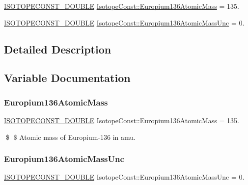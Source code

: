 \begin{DoxyCompactItemize}
\item 
\mbox{\hyperlink{group___isotope_const-_macros_ga8f45a7272ce02c0b4c65c44636ed719a}{I\+S\+O\+T\+O\+P\+E\+C\+O\+N\+S\+T\+\_\+\+D\+O\+U\+B\+LE}} \mbox{\hyperlink{group___isotope_const-_europium-_eu136_ga1d40b2c8821fce6782147cfffcae695d}{Isotope\+Const\+::\+Europium136\+Atomic\+Mass}} = 135.
\item 
\mbox{\hyperlink{group___isotope_const-_macros_ga8f45a7272ce02c0b4c65c44636ed719a}{I\+S\+O\+T\+O\+P\+E\+C\+O\+N\+S\+T\+\_\+\+D\+O\+U\+B\+LE}} \mbox{\hyperlink{group___isotope_const-_europium-_eu136_ga01836f0c534108e09c55f8033e7f0e2b}{Isotope\+Const\+::\+Europium136\+Atomic\+Mass\+Unc}} = 0.
\end{DoxyCompactItemize}


\subsection{Detailed Description}


\subsection{Variable Documentation}
\mbox{\label{group___isotope_const-_europium-_eu136_ga1d40b2c8821fce6782147cfffcae695d}} 
\subsubsection{\texorpdfstring{Europium136\+Atomic\+Mass}{Europium136AtomicMass}}
{\footnotesize\ttfamily \mbox{\hyperlink{group___isotope_const-_macros_ga8f45a7272ce02c0b4c65c44636ed719a}{I\+S\+O\+T\+O\+P\+E\+C\+O\+N\+S\+T\+\_\+\+D\+O\+U\+B\+LE}} Isotope\+Const\+::\+Europium136\+Atomic\+Mass = 135.}

\$ \$ Atomic mass of Europium-\/136 in amu. \mbox{\label{group___isotope_const-_europium-_eu136_ga01836f0c534108e09c55f8033e7f0e2b}} 
\subsubsection{\texorpdfstring{Europium136\+Atomic\+Mass\+Unc}{Europium136AtomicMassUnc}}
{\footnotesize\ttfamily \mbox{\hyperlink{group___isotope_const-_macros_ga8f45a7272ce02c0b4c65c44636ed719a}{I\+S\+O\+T\+O\+P\+E\+C\+O\+N\+S\+T\+\_\+\+D\+O\+U\+B\+LE}} Isotope\+Const\+::\+Europium136\+Atomic\+Mass\+Unc = 0.}

